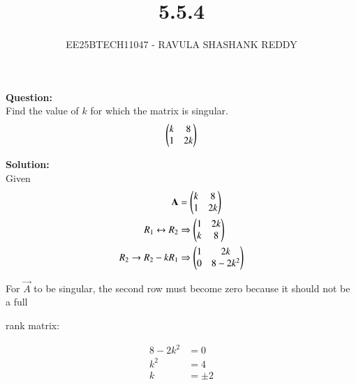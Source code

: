 \documentclass[journal]{article}
\begin{document}
	
	
	\vspace{3cm}
	
\title{5.5.4}
\author{EE25BTECH11047 - RAVULA SHASHANK REDDY}
\maketitle
\hrulefill
\bigskip 

\renewcommand{\thetable}{\theenumi}
\setlength{\intextsep}{10pt}

\textbf{Question:} \\

Find the value of $k$ for which the matrix is singular.
\begin{align*}
\begin{pmatrix}k & 8 \\ 1 & 2k\end{pmatrix}
\end{align*}

\textbf{Solution:}\\

Given
\begin{align}
\mathbf{A}&= \begin{pmatrix}k & 8 \\ 1 & 2k\end{pmatrix} \\
R_1 \leftrightarrow R_2 &\Rightarrow \begin{pmatrix}1 & 2k \\ k & 8\end{pmatrix} \\
R_2 \to R_2 - kR_1 &\Rightarrow \begin{pmatrix}1 & 2k \\ 0 & 8 - 2k^2\end{pmatrix} 
\end{align}

For $\vec{A}$ to be singular, the second row must become zero because it should not be a full 

rank matrix: 

\begin{align}
8 - 2k^2 &= 0 \\
k^2 &= 4 \\
k &= \pm 2 
\end{align}
\end{document}
